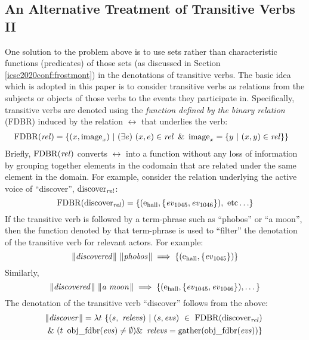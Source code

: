 \documentclass[../main.tex]{subfiles}
\begin{document}
\begin{refsection}
\subsection{An Alternative Treatment of Transitive Verbs II}
\label{icsc2020conf:altvbii}


One solution to the problem above is to use sets rather than characteristic functions (predicates) of those sets (as discussed in Section \ref{icsc2020conf:frostmont}) in the denotations of transitive verbs. The basic idea \cite{frost1989constructing} which is adopted in this paper is to consider transitive verbs as relations from the subjects or objects of those verbs to the events they participate in.
Specifically, transitive verbs are denoted using the {\em function defined by the binary relation} (FDBR) \cite{peelar2016accommodating} induced by the relation $\rel$ that underlies the verb:
\begin{equation*}
	\begin{split}
		&\operatorname{FDBR}({\operatorname{\mathit{rel}}}) = \{(x, \operatorname{image}_x)\ | \ (\exists e)\ (x, e) \in \operatorname{\mathit{rel}}\ \& \ \operatorname{image}_x = \{ y\ |\ (x, y) \in \operatorname{\mathit{rel}} \}  \}
	\end{split}
\end{equation*}
Briefly, $\operatorname{FDBR}({\operatorname{\mathit{rel}}})$ converts $\rel$ into a function without any loss of information by grouping together elements in the codomain that are related under the same element in the domain. For example, consider the relation underlying the active voice of ``discover'', $\operatorname{discover}_{\operatorname{\mathit{rel}}}$:
\[ \FDBR{\relation{discover}} = \{(\entityassoc{\hall}, \{ \eventassoc{1045}, \eventassoc{1046} \} ),\ \dmathrm{etc} \ldots \} \]
If the transitive verb is followed by a term-phrase such as ``phobos'' or ``a moon'', then
the function denoted by that term-phrase is used to ``filter'' the denotation of the transitive verb for relevant actors. For example:
\[ \lVert\textit{discovered\hspace{0.1em}}\rVert \ \lVert\textit{phobos\hspace{0.1em}}\rVert \implies \{ (\mathrm{e}_{\operatorname{\operatorname{hall}}}, \{ \operatorname{\mathit{ev}}_{1045} \} ) \} \]
Similarly,
\[\meaningof{discovered} \ \meaningof{a\ moon} \implies \{ (\entityassoc{\hall}, \{ \eventassoc{1045}, \eventassoc{1046} \} ), \dots \} \]
\noindent The denotation of the transitive verb ``discover'' follows from the above:
\begin{multline*}
	\meaningof{discover} =
	\lambda t\ \{ (s,\ \opit{relevs})\ |\ (s, \evs)\ \in\ \FDBR{\relation{discover}}\  \\
	\&\ (t\ \objfdbr{\evs} \neq \emptyset)
	\&\ \opit{relevs} = \gatherevs{\objfdbr{\evs}} \}

\end{multline*}
\end{refsection}
\end{document}
